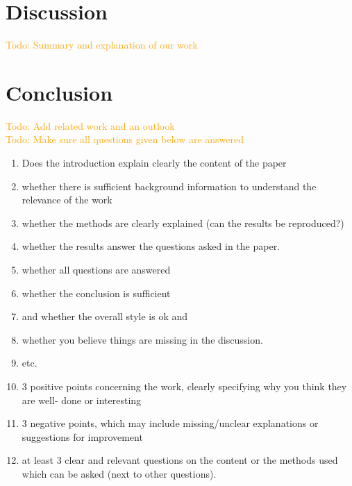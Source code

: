 \documentclass[letterpaper]{article}
\newcommand\todo[1]{\textcolor{orange}{Todo: #1}}
\begin{document}
\section{Discussion}
\todo{Summary and explanation of our work}

\section{Conclusion}
\todo{Add related work and an outlook}
\\\todo{Make sure all questions given below are answered}
\begin{enumerate}
 \item Does the introduction explain clearly the content of the paper
 \item whether there is sufficient background information to understand the relevance of the work
 \item whether the methods are clearly explained (can the results be reproduced?)
 \item whether the results answer the questions asked in the paper.
 \item whether all questions are answered
 \item whether the conclusion is sufficient
 \item and whether the overall style is ok and
 \item whether you believe things are missing in the discussion.
 \item etc.
 \item 3 positive points concerning the work, clearly specifying why you think they are well-
       done or interesting
 \item 3 negative points, which may include missing/unclear explanations or suggestions for
       improvement
 \item at least 3 clear and relevant questions on the content or the methods used which can be asked (next to other questions).
\end{enumerate}

\footnotesize


\end{document}
